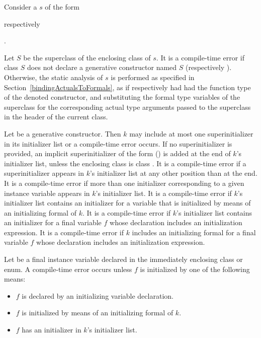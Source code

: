 \documentclass[makeidx]{article}
\begin{document}
\LMHash{}%
Consider a  $s$ of the form

\noindent
{}
respectively

\noindent
{}.

\noindent{}%
Let $S$ be the superclass of the enclosing class of $s$.
It is a compile-time error if class $S$ does not declare
a generative constructor named $S$ (respectively ).
Otherwise, the static analysis of $s$ is performed
as specified in Section~\ref{bindingActualsToFormals},
as if \code{\SUPER} respectively 
had had the function type of the denoted constructor,
and substituting the formal type variables of the superclass
for the corresponding actual type arguments passed to the superclass
in the header of the current class.

\LMHash{}%
Let  be a generative constructor.
Then $k$ may include at most one superinitializer in its initializer list
or a compile-time error occurs.
If no superinitializer is provided,
an implicit superinitializer of the form \SUPER{}() is added
at the end of $k$'s initializer list,
unless the enclosing class is class .
It is a compile-time error if a superinitializer appears
in $k$'s initializer list at any other position than at the end.
It is a compile-time error if more than one initializer corresponding
to a given instance variable appears in $k$'s initializer list.
It is a compile-time error if $k$'s initializer list contains
an initializer for a variable that is initialized by means of
an initializing formal of $k$.
It is a compile-time error if $k$'s initializer list contains
an initializer for a final variable $f$ whose declaration includes
an initialization expression.
It is a compile-time error if $k$ includes an initializing formal
for a final variable $f$ whose declaration includes
an initialization expression.

\LMHash{}%
Let  be a final instance variable declared in
the immediately enclosing class or enum.
A compile-time error occurs unless $f$ is initialized
by one of the following means:
\begin{itemize}
\item $f$ is declared by an initializing variable declaration.
\item $f$ is initialized by means of an initializing formal of $k$.
\item $f$ has an initializer in $k$'s initializer list.
\end{itemize}
\end{document}

